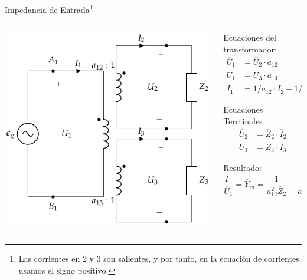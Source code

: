 \documentclass[aspectratio=169, usenames,svgnames,dvipsnames]{beamer}
\begin{document}
\begin{frame}[label={sec:orge5e6c62}]{Impedancia de Entrada\footnote{Las corrientes en 2 y 3 son salientes, y por tanto, en la ecuación de corrientes usamos el signo positivo.}}
\begin{columns}
\begin{column}{0.4\columnwidth}
\begin{center}
\includegraphics[width=.9\linewidth]{../figs/TrafoIdealVariosDevanados_Impedancia.pdf}
\end{center}
\end{column}

\begin{column}{0.6\columnwidth}
Ecuaciones del transformador:
\begin{align*}
  \overline{U}_1 &= \overline{U}_2 \cdot a_{12}\\
  \overline{U}_1 &= \overline{U}_3 \cdot a_{13}\\
  \overline{I}_1 &= 1/a_{12} \cdot \overline{I}_2 + 1/a_{13} \cdot  \overline{I}_3
\end{align*}

Ecuaciones Terminales
\begin{align*}
  \overline{U}_2 &= \overline{Z}_2 \cdot \overline{I}_2\\
  \overline{U}_3 &= \overline{Z}_3 \cdot \overline{I}_3
\end{align*}

Resultado:
\[
  \frac{\overline{I}_1}{\overline{U}_1} = \boxed{\overline{Y}_{in} = \frac{1}{a^2_{12} \overline{Z}_2} +  \frac{1}{a^2_{13} \overline{Z}_3}}
\]
\end{column}
\end{columns}
\end{frame}
\end{document}
